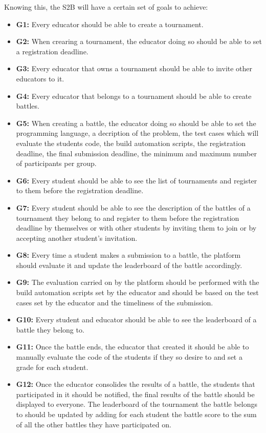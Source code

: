 \documentclass{article}
\begin{document}
Knowing this, the S2B will have a certain set of goals to achieve:
\begin{itemize}
    \item \textbf{G1:} Every educator should be able to create a tournament.
    \item \textbf{G2:} When crearing a tournament, the educator doing so should be able to set a registration deadline.
    \item \textbf{G3:} Every educator that owns a tournament should be able to invite other educators to it.
    \item \textbf{G4:} Every educator that belongs to a tournament should be able to create battles.
    \item \textbf{G5:} When creating a battle, the educator doing so should be able to set the programming language, a decription of the problem, the test cases which will evaluate the students code, the build automation scripts, the registration deadline, the final submission deadline, the minimum and maximum number of participants per group.
    \item \textbf{G6:} Every student should be able to see the list of tournaments and register to them before the registration deadline.
    \item \textbf{G7:} Every student should be able to see the description of the battles of a tournament they belong to and register to them before the registration deadline by themselves or with other students by inviting them to join or by accepting another student's invitation.
    \item \textbf{G8:} Every time a student makes a submission to a battle, the platform should evaluate it and update the leaderboard of the battle accordingly.
    \item \textbf{G9:} The evaluation carried on by the platform should be performed with the build automation scripts set by the educator and should be based on the test cases set by the educator and the timeliness of the submission.
    \item \textbf{G10:} Every student and educator should be able to see the leaderboard of a battle they belong to.
    \item \textbf{G11:} Once the battle ends, the educator that created it should be able to manually evaluate the code of the students if they so desire to and set a grade for each student.
    \item \textbf{G12:} Once the educator consolides the results of a battle, the students that participated in it should be notified, the final results of the battle should be displayed to everyone. The leaderboard of the tournament the battle belongs to should be updated by adding for each student the battle score to the sum of all the other battles they have participated on.

\end{itemize}
\end{document}
